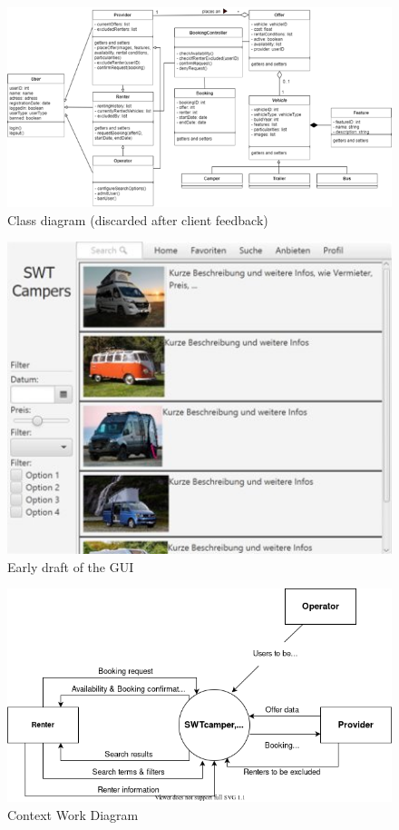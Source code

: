 \begin{figure}[h]
	\centering
	\includegraphics[width=15cm]{resources/images/class_diagram_old.png}
	\caption{Class diagram (discarded after client feedback)}
	\label{fig:class_diagram_old}
\end{figure}

\begin{figure}[h]
	\centering
	\includegraphics[width=15cm]{resources/images/gui_sketch.png}
	\caption{Early draft of the GUI}
	\label{fig:gui_sketch}
\end{figure}

\begin{figure}[h]
	\centering
	\includegraphics[width=12cm]{resources/images/context_work_diagram.png}
	\caption{Context Work Diagram}
	\label{fig:context_work_diagram}
\end{figure}

